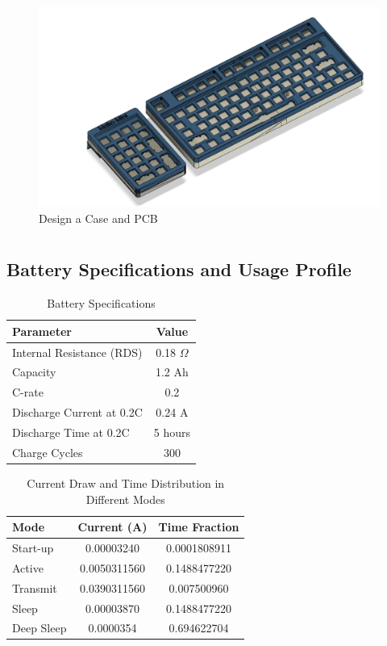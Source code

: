 \documentclass[a4paper,11pt]{article}%
\begin{document}
\begin{figure}[H]
	\centering
	\includegraphics[scale=0.17]{figures/3d_print_fusion.png}
	\caption{Design a Case and PCB}
\end{figure}

\pagebreak




\section{\color{red}{Update 3}}


\subsection{Battery Specifications and Usage Profile}

\begin{table}[h]
\centering
\begin{tabular}{|l|c|}
\hline
\textbf{Parameter} & \textbf{Value} \\
\hline
Internal Resistance (RDS) & 0.18 $\Omega$ \\
Capacity & 1.2 Ah \\
C-rate & 0.2 \\
Discharge Current at 0.2C & 0.24 A \\
Discharge Time at 0.2C & 5 hours \\
Charge Cycles & 300 \\
\hline
\end{tabular}
\caption{Battery Specifications}
\label{tab:battery_specs}
\end{table}

\begin{table}[h]
\centering
\begin{tabular}{|l|c|c|}
\hline
\textbf{Mode} & \textbf{Current (A)} & \textbf{Time Fraction} \\
\hline
Start-up & 0.00003240 & 0.0001808911 \\
Active & 0.0050311560 & 0.1488477220 \\
Transmit & 0.0390311560 & 0.007500960 \\
Sleep & 0.00003870 & 0.1488477220 \\
Deep Sleep & 0.0000354 & 0.694622704 \\
\hline
\end{tabular}
\caption{Current Draw and Time Distribution in Different Modes}
\label{tab:current_distribution}
\end{table}
\end{document}
